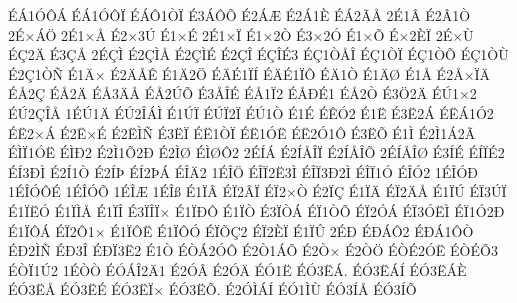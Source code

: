 {^^c9^^c11^^d3^^d4^^c1
^^c9^^c11^^d3^^d4^^cf
^^c9^^c1^^d41^^d2^^cf
^^c93^^c1^^d4^^d5
^^c92^^c1^^c6
^^c92^^c11^^c8
^^c9^^c12^^c3^^c5
2^^c91^^c2
^^c92^^c21^^d2
2^^c9^^d7^^c1^^d6
2^^c91^^d7^^c5
^^c92^^d73^^da
^^c91^^d7^^c9
2^^c91^^d7^^cf
^^c91^^d72^^d2
^^c93^^d72^^d3
^^c91^^d7^^d5
^^c9^^d72^^c8^^cf
2^^c9^^d7^^d9
^^c9^^c72^^c4
^^c93^^c7^^c5
2^^c9^^c7^^cc
^^c92^^c7^^cc^^c5
^^c92^^c7^^cc^^c9
^^c92^^c7^^ce
^^c9^^c7^^ce^^c93
^^c9^^c71^^d2^^c5^^ce
^^c9^^c71^^d2^^cf
^^c9^^c71^^d2^^d5
^^c9^^c71^^d2^^d9
^^c92^^c71^^d2^^d1
^^c91^^c4^^d7
^^c92^^c4^^c5^^ca
^^c91^^c42^^d6
^^c9^^c4^^c91^^cf^^cd
^^c9^^c4^^c91^^cf^^d4
^^c9^^c41^^d2
^^c91^^c4^^d8
^^c91^^c5
^^c92^^c5^^d7^^cf^^c4
^^c9^^c52^^c7
^^c9^^c52^^c4
^^c9^^c53^^c4^^c5
^^c9^^c52^^da^^d5
^^c93^^c5^^ce^^c9
^^c9^^c51^^cf2
^^c9^^c5^^d0^^c91
^^c9^^c52^^d2
^^c93^^d62^^c4
^^c9^^da1^^d72
^^c9^^da2^^c7^^ce^^c5
1^^c9^^da1^^c4
^^c9^^da2^^ce^^c1^^cc
^^c91^^da^^cf
^^c9^^da^^cf2^^cf
^^c9^^da1^^d2
^^c91^^c9
^^c9^^ca^^d32
^^c91^^cb
^^c93^^cb2^^c1
^^c9^^cb^^c11^^d32
^^c9^^cb2^^d7^^c1
^^c92^^cb^^d7^^c9
^^c92^^cb^^cc^^d1
^^c93^^cb^^cf
^^c9^^cb1^^d2^^cf
^^c9^^cb1^^d3^^cb
^^c9^^cb2^^d31^^d4
^^c93^^cb^^d5
^^c91^^cc
^^c92^^cc1^^c12^^c3
^^c9^^cc^^cf1^^d3^^cb
^^c9^^cc^^d02
^^c92^^cc1^^d52^^d0
^^c92^^cc^^d8
^^c9^^cc^^d8^^d42
2^^c9^^cd^^c1
^^c92^^cd^^c5^^ce^^cf
^^c92^^cd^^c5^^ce^^d5
2^^c9^^cd^^c5^^ce^^d8
^^c93^^cd^^c9
^^c9^^cd^^cf^^c92
^^c9^^cd3^^d0^^cc
^^c92^^cd1^^d2
^^c92^^cd^^de
^^c9^^cd2^^de^^c1
^^c9^^ce^^c42
1^^c9^^ce^^d6
^^c9^^ce^^cf2^^cb3^^cc
^^c9^^ce^^cf3^^d02^^cc
^^c9^^ce^^cf1^^d3
^^c9^^ce^^d32
1^^c9^^ce^^d3^^d0
1^^c9^^ce^^d3^^d4^^c9
1^^c9^^ce^^d3^^d5
1^^c9^^ce^^c6
1^^c9^^ce^^df
^^c91^^cf^^c2
^^c9^^cf2^^c2^^cf
^^c9^^cf2^^d7^^d2
^^c92^^cf^^c7
^^c91^^cf^^c4
^^c9^^cf2^^c4^^c5
^^c91^^cf^^da
^^c9^^cf3^^da^^cf
^^c91^^cf^^cb^^d3
^^c91^^cf^^cc^^c5
^^c91^^cf^^ce
^^c93^^cf^^ce^^cf^^d7
^^c91^^cf^^d0^^d4
^^c91^^cf^^d2
^^c93^^cf^^d2^^c1
^^c9^^cf1^^d2^^d5
^^c9^^cf2^^d3^^c1
^^c9^^cf3^^d3^^cb^^cc
^^c9^^cf1^^d32^^d0
^^c91^^cf^^d4^^c1
^^c9^^cf2^^d41^^d7
^^c91^^cf^^d4^^cb
^^c91^^cf^^d4^^d3
^^c9^^cf^^d5^^c72
^^c9^^cf2^^c8^^cf
^^c91^^cf^^db
2^^c9^^d0
^^c9^^d0^^c1^^d42
^^c9^^d0^^c11^^d4^^d2
^^c9^^d02^^cc^^d1
^^c9^^d03^^ce
^^c9^^d0^^cf3^^cb2
^^c91^^d2
^^c9^^d2^^c12^^d3^^d4
^^c92^^d21^^c1^^d5
^^c92^^d2^^d7
^^c92^^d2^^d6
^^c9^^d2^^c92^^d3^^cb
^^c9^^d2^^c9^^d53
^^c9^^d2^^cf1^^da2
1^^c9^^d2^^d2
^^c9^^d3^^c1^^ce2^^c41
^^c92^^d3^^c2
^^c92^^d3^^c4
^^c9^^d31^^cb
^^c9^^d33^^cb^^c1.
^^c9^^d33^^cb^^c1^^cd
^^c9^^d33^^cb^^c1^^c8
^^c9^^d33^^cb^^c5
^^c9^^d33^^cb^^c9
^^c9^^d33^^cb^^cf^^d7
^^c9^^d33^^cb^^d5.
^^c92^^d3^^cc^^c1^^cd
^^c9^^d31^^cc^^d9
^^c9^^d33^^cd^^c5
^^c9^^d33^^cd^^d5
}
